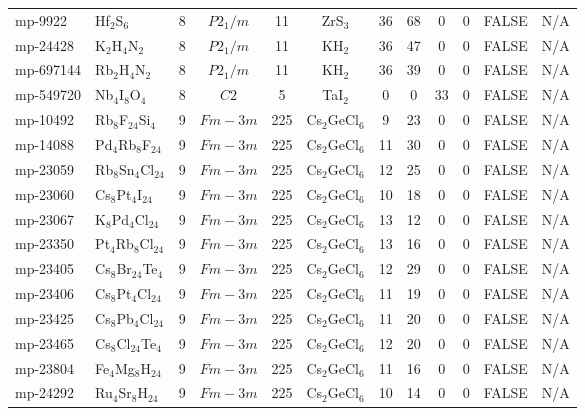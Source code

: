 {\begin{longtable}{llcccccccccc}
    mp-9922 & Hf$_{2}$S$_{6}$ & 8     & $P2_1/m$ & 11    & ZrS$_{3}$ & 36    & 68    & 0     & 0     & FALSE & N/A \\
    mp-24428 & K$_{2}$H$_{4}$N$_{2}$ & 8     & $P2_1/m$ & 11    & KH$_{2}$ & 36    & 47    & 0     & 0     & FALSE & N/A \\
    mp-697144 & Rb$_{2}$H$_{4}$N$_{2}$ & 8     & $P2_1/m$ & 11    & KH$_{2}$ & 36    & 39    & 0     & 0     & FALSE & N/A \\
    mp-549720 & Nb$_{4}$I$_{8}$O$_{4}$ & 8     & $C2$  & 5     & TaI$_{2}$ & 0     & 0     & 33    & 0     & FALSE & N/A \\
    mp-10492 & Rb$_{8}$F$_{24}$Si$_{4}$ & 9     & $Fm-3m$ & 225   & Cs$_{2}$GeCl$_{6}$ & 9     & 23    & 0     & 0     & FALSE & N/A \\
    mp-14088 & Pd$_{4}$Rb$_{8}$F$_{24}$ & 9     & $Fm-3m$ & 225   & Cs$_{2}$GeCl$_{6}$ & 11    & 30    & 0     & 0     & FALSE & N/A \\
    mp-23059 & Rb$_{8}$Sn$_{4}$Cl$_{24}$ & 9     & $Fm-3m$ & 225   & Cs$_{2}$GeCl$_{6}$ & 12    & 25    & 0     & 0     & FALSE & N/A \\
    mp-23060 & Cs$_{8}$Pt$_{4}$I$_{24}$ & 9     & $Fm-3m$ & 225   & Cs$_{2}$GeCl$_{6}$ & 10    & 18    & 0     & 0     & FALSE & N/A \\
    mp-23067 & K$_{8}$Pd$_{4}$Cl$_{24}$ & 9     & $Fm-3m$ & 225   & Cs$_{2}$GeCl$_{6}$ & 13    & 12    & 0     & 0     & FALSE & N/A \\
    mp-23350 & Pt$_{4}$Rb$_{8}$Cl$_{24}$ & 9     & $Fm-3m$ & 225   & Cs$_{2}$GeCl$_{6}$ & 13    & 16    & 0     & 0     & FALSE & N/A \\
    mp-23405 & Cs$_{8}$Br$_{24}$Te$_{4}$ & 9     & $Fm-3m$ & 225   & Cs$_{2}$GeCl$_{6}$ & 12    & 29    & 0     & 0     & FALSE & N/A \\
    mp-23406 & Cs$_{8}$Pt$_{4}$Cl$_{24}$ & 9     & $Fm-3m$ & 225   & Cs$_{2}$GeCl$_{6}$ & 11    & 19    & 0     & 0     & FALSE & N/A \\
    mp-23425 & Cs$_{8}$Pb$_{4}$Cl$_{24}$ & 9     & $Fm-3m$ & 225   & Cs$_{2}$GeCl$_{6}$ & 11    & 20    & 0     & 0     & FALSE & N/A \\
    mp-23465 & Cs$_{8}$Cl$_{24}$Te$_{4}$ & 9     & $Fm-3m$ & 225   & Cs$_{2}$GeCl$_{6}$ & 12    & 20    & 0     & 0     & FALSE & N/A \\
    mp-23804 & Fe$_{4}$Mg$_{8}$H$_{24}$ & 9     & $Fm-3m$ & 225   & Cs$_{2}$GeCl$_{6}$ & 11    & 16    & 0     & 0     & FALSE & N/A \\
    mp-24292 & Ru$_{4}$Sr$_{8}$H$_{24}$ & 9     & $Fm-3m$ & 225   & Cs$_{2}$GeCl$_{6}$ & 10    & 14    & 0     & 0     & FALSE & N/A \\

\end{longtable}}
